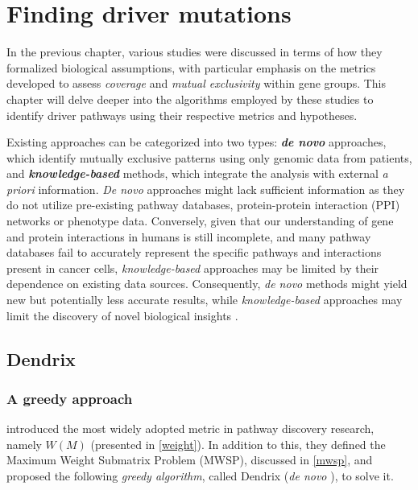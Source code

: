 \chapter{Finding driver mutations} \label{chap:finding_driver_mutations}


In the previous chapter, various studies were discussed in terms of how they formalized biological assumptions, with particular emphasis on the metrics developed to assess \textit{coverage} and \textit{mutual exclusivity} within gene groups. This chapter will delve deeper into the algorithms employed by these studies to identify driver pathways using their respective metrics and hypotheses.

Existing approaches can be categorized into two types: \textbf{\textit{de novo}} approaches, which identify mutually exclusive patterns using only genomic data from patients, and \textbf{\textit{knowledge-based}} methods, which integrate the analysis with external \textit{a priori} information. \textit{De novo} approaches might lack sufficient information as they do not utilize pre-existing pathway databases, protein-protein interaction (PPI) networks or phenotype data. Conversely, given that our understanding of gene and protein interactions in humans is still incomplete, and many pathway databases fail to accurately represent the specific pathways and interactions present in cancer cells, \textit{knowledge-based} approaches may be limited by their dependence on existing data sources. Consequently, \textit{de novo} methods might yield new but potentially less accurate results, while \textit{knowledge-based} approaches may limit the discovery of novel biological insights \cite{survey, multi-dendrix}.

\section{Dendrix}

\subsection{A greedy approach}

\textcite{dendrix} introduced the most widely adopted metric in pathway discovery research, namely $W(M)$ (presented in \cref{weight}). In addition to this, they defined the Maximum Weight Submatrix Problem (MWSP), discussed in \cref{mwsp}, and proposed the following \textit{greedy algorithm}, called Dendrix (\textit{de novo} \cite{survey}), to solve it.


